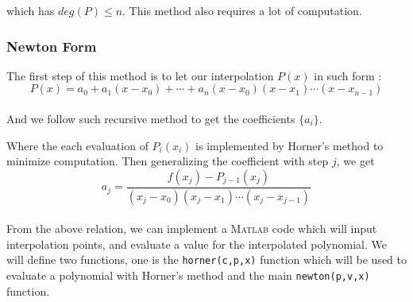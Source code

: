 \documentclass[paper=a4, fontsize=11pt]{scrartcl}
\newcommand{\MATLAB}{\textsc{Matlab}\xspace}
\begin{document}
which has $deg(P) \leq n$. This method also requires a lot of computation.\\

\vspace{0.15in}
\subsubsection{Newton Form}
\vspace{0.15in}
The first step of this method is to let our interpolation $P(x)$ in such form :\\

\begin{equation}\nonumber
	P(x) = a_0 + a_1 (x-x_0)+  \cdots + a_n (x-x_0)(x-x_1) \cdots (x-x_{n-1})
\end{equation}\\

And we follow such recursive method to get the coefficients $\{a_i\}$.\\


Where the each evaluation of $P_i(x_i)$ is implemented by Horner's method to minimize computation. Then generalizing the coefficient with step $j$, we get \\

\begin{equation} \nonumber
	a_j = \frac{f(x_j) - P_{j-1}(x_j)}{(x_j - x_0)(x_j - x_1) \cdots (x_j - x_{j-1})}
\end{equation}\\

From the above relation, we can implement a \MATLAB code which will input interpolation points, and evaluate a value for the interpolated polynomial. We will define two functions, one is the \texttt{horner(c,p,x)} function which will be used to evaluate a polynomial with Horner's method and the main \texttt{newton(p,v,x)} function.\\
\end{document}
